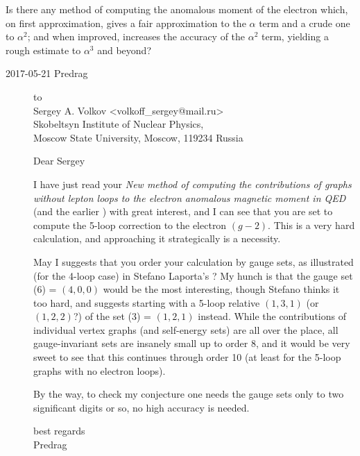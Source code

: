 
\begin{bartlett}{
Is there any method of computing the anomalous moment of the
electron which, on first approximation, gives a fair approximation to the
$\alpha$ term and a crude one to $\alpha^2$; and when improved, increases
the accuracy of the $\alpha^2$ term, yielding a rough estimate to
$\alpha^3$ and beyond?
        }
\end{bartlett}



\begin{description}

\item[2017-05-21 Predrag] to
\\
Sergey  A. Volkov <volkoff\_sergey@mail.ru>
\\
Skobeltsyn Institute of Nuclear Physics,
\\
Moscow State University, Moscow, 119234 Russia

Dear Sergey

I have just read your
{\em New method of computing the contributions of graphs without lepton
loops to the electron anomalous magnetic moment in {QED}}
(and the earlier ) with great interest, and I can see
that you are set to compute the 5-loop correction to the electron
$(g-2)$. This is a very hard calculation, and approaching it
strategically is a necessity.

May I suggests that you order your calculation by gauge sets,
as illustrated (for the 4-loop case) in Stefano Laporta's
? My hunch is that the gauge set (6) = $(4,0,0)$ would be
the most interesting, though Stefano thinks it too hard, and suggests
starting with a 5-loop relative $(1,3,1)$ (or $(1,2,2)$?)
of the set (3) = $(1,2,1)$ instead. While the
contributions of individual vertex graphs (and self-energy sets)
are all over the place, all gauge-invariant sets are insanely small up to
order 8, and it would be very sweet to see that this continues through
order 10 (at least for the 5-loop graphs with no electron loops).

By the way, to check my conjecture one needs the gauge sets only to two
significant digits or so, no high accuracy is needed.

best regards
\\
Predrag


\end{description}

